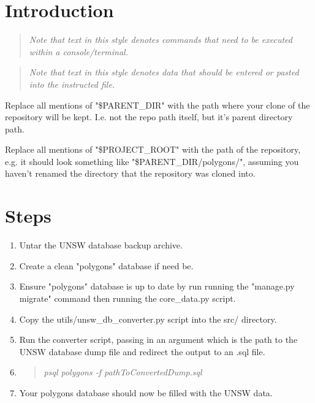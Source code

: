 \documentclass[12pt]{article}
\newenvironment{command}
   { 
      \begin{quote}\itshape
      \color{blue}
   }
   { \end{quote} }
\newenvironment{data}
   { 
      \begin{quote}\itshape
      \color{red}
   }
   { \end{quote} }
\begin{document}
\section{Introduction}

\begin{command} Note that text in this style denotes commands that need to be
executed within a console/terminal. \end{command}

\begin{data} Note that text in this style denotes data that should be entered or
pasted into the instructed file. \end{data}

Replace all mentions of "\$PARENT\_DIR" with the path where your clone of the
repository will be kept. I.e. not the repo path itself, but it's parent
directory path.

Replace all mentions of "\$PROJECT\_ROOT" with the path of the repository, e.g.
it should look something like "\$PARENT\_DIR/polygons/", assuming you haven't
renamed the directory that the repository was cloned into.

\section{Steps}

\begin{enumerate}
   \item Untar the UNSW database backup archive.
   \item Create a clean "polygons" database if need be.
   \item Ensure "polygons" database is up to date by run running the "manage.py
         migrate" command then running the core\_data.py script.
   \item Copy the utils/unsw\_db\_converter.py script into the src/ directory.
   \item Run the converter script, passing in an argument which is the path to
         the UNSW database dump file and redirect the output to an .sql file.
   \item \begin{command} psql polygons -f pathToConvertedDump.sql \end{command}
   \item Your polygons database should now be filled with the UNSW data.
\end{enumerate}
\end{document}
